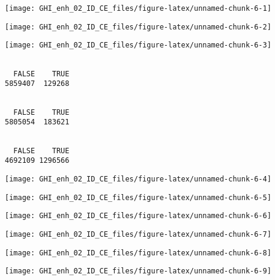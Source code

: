 \documentclass[
  10pt,
  a4paper,oneside]{article}
\begin{document}
\begin{center}\texttt{[image: GHI\_enh\_02\_ID\_CE\_files/figure-latex/unnamed-chunk-6-1]} \end{center}

\begin{center}\texttt{[image: GHI\_enh\_02\_ID\_CE\_files/figure-latex/unnamed-chunk-6-2]} \end{center}

\begin{center}\texttt{[image: GHI\_enh\_02\_ID\_CE\_files/figure-latex/unnamed-chunk-6-3]} \end{center}

\begin{verbatim}

  FALSE    TRUE 
5859407  129268 
\end{verbatim}

\begin{verbatim}

  FALSE    TRUE 
5805054  183621 
\end{verbatim}

\begin{verbatim}

  FALSE    TRUE 
4692109 1296566 
\end{verbatim}

\begin{center}\texttt{[image: GHI\_enh\_02\_ID\_CE\_files/figure-latex/unnamed-chunk-6-4]} \end{center}

\begin{center}\texttt{[image: GHI\_enh\_02\_ID\_CE\_files/figure-latex/unnamed-chunk-6-5]} \end{center}

\begin{center}\texttt{[image: GHI\_enh\_02\_ID\_CE\_files/figure-latex/unnamed-chunk-6-6]} \end{center}

\begin{center}\texttt{[image: GHI\_enh\_02\_ID\_CE\_files/figure-latex/unnamed-chunk-6-7]} \end{center}

\begin{center}\texttt{[image: GHI\_enh\_02\_ID\_CE\_files/figure-latex/unnamed-chunk-6-8]} \end{center}

\begin{center}\texttt{[image: GHI\_enh\_02\_ID\_CE\_files/figure-latex/unnamed-chunk-6-9]} \end{center}
\end{document}
